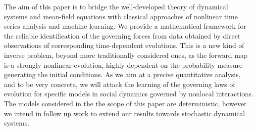 The aim of this paper is to bridge the well-developed theory of dynamical systems and mean-field equations with classical  approaches of nonlinear time series analysis and machine learning. We  provide a  mathematical framework for the reliable identification of the governing forces from data obtained by direct observations of corresponding time-dependent evolutions. This is a new kind of inverse problem, beyond more traditionally considered ones, as the forward map is a strongly nonlinear  evolution, highly dependent on the probability measure generating the initial conditions. As we aim at a precise quantitative analysis, and to be very concrete, we will  attack the learning of the governing laws of evolution for specific models in social dynamics governed by nonlocal interactions. The models considered in the the scope of this paper are deterministic, however we intend in follow up work to extend our results towards stochastic dynamical systems.


